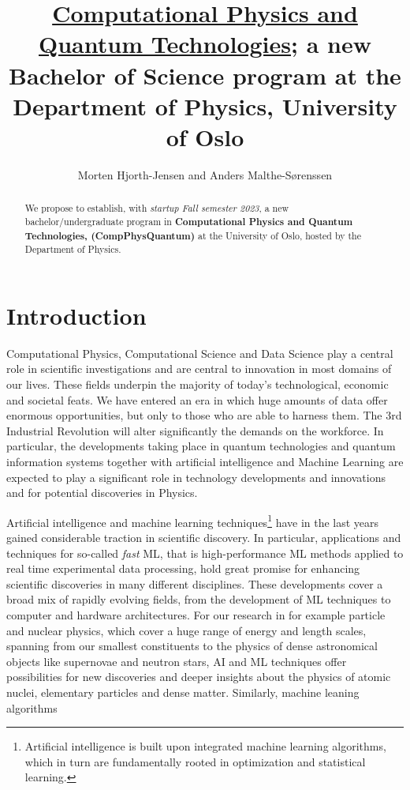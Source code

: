 \documentclass[aps,rmp,reprint,amsmath,amssymb,graphicx,longbibliography]{revtex4-1}
\begin{document}
\title{\underline{Computational Physics and Quantum Technologies}; a new Bachelor of Science program  at the Department of Physics, University of Oslo}

\author{Morten Hjorth-Jensen and Anders Malthe-Sørenssen}


\begin{abstract}
We propose to establish, with {\em startup Fall semester 2023}, a new bachelor/undergraduate program in {\bf Computational Physics and Quantum Technologies, (CompPhysQuantum)}  at the University of Oslo, hosted by the Department of Physics. 
\end{abstract}
\maketitle
\section{Introduction}

Computational Physics, Computational Science  and Data Science play a central role in scientific investigations and are central to innovation in most domains of our lives. These fields underpin the majority of today's technological, economic and societal feats. We have entered an era in which huge amounts of data offer enormous opportunities, but only to those who are able to harness them. The 3rd Industrial Revolution will alter significantly the demands on the workforce. In particular, the developments taking place in quantum technologies and quantum information systems together with artificial intelligence and Machine Learning are expected to play a significant role in technology developments and innovations and for potential discoveries in Physics.

Artificial intelligence and machine learning techniques\footnote{Artificial intelligence is built upon integrated machine learning algorithms, which in turn are fundamentally rooted in optimization and statistical learning.} have in the last years gained considerable traction in scientific discovery. In particular, applications and techniques for so-called {\em fast} ML, that is high-performance ML methods applied to real time experimental data processing, hold great promise for enhancing scientific discoveries in many different disciplines\cite{deiana2021}. 
These developments cover a broad mix of rapidly evolving  fields, from the development of ML techniques to computer and hardware architectures. For our research in for example particle and nuclear physics, which cover a huge range of energy and length scales, spanning from our smallest constituents to the physics of dense astronomical objects like supernovae and neutron stars, AI and ML techniques offer possibilities for new discoveries and deeper insights about the physics of atomic nuclei, elementary particles and dense matter. Similarly, machine leaning algorithms 
\end{document}

